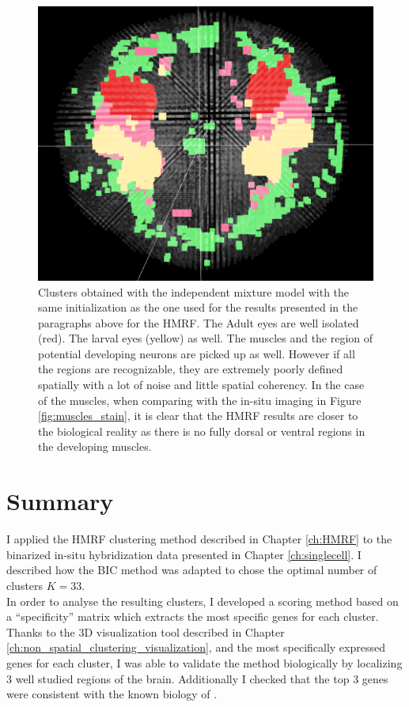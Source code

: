 	\begin{figure}[H]
\centerline{\includegraphics[width=\linewidth]{gfx/chapter6/mixture.png}}
\caption{Clusters obtained with the independent mixture model with the same initialization as the one used for the results presented in the paragraphs above for the HMRF. The Adult eyes are well isolated (red). The larval eyes (yellow) as well. The muscles and the region of potential developing neurons are picked up as well. However if all the regions are recognizable, they are extremely poorly defined spatially with a lot of noise and little spatial coherency. In the case of the muscles, when comparing with the in-situ imaging in Figure \ref{fig:muscles_stain}, it is clear that the HMRF results are closer to the biological reality as there is no fully dorsal or ventral regions in the developing muscles.}
\label{fig:mixture_clust}
	\end{figure}
	
	
	 

\section{Summary}
	
I applied the HMRF clustering method described in Chapter \ref{ch:HMRF} to the binarized in-situ hybridization data presented in Chapter \ref{ch:singlecell}. I described how the BIC method was adapted to chose the optimal number of clusters $K = 33$.\\

In order to analyse the resulting clusters, I developed a scoring method based on a ``specificity'' matrix which extracts the most specific genes for each cluster. Thanks to the 3D visualization tool described in Chapter \ref{ch:non_spatial_clustering_visualization}, and the most specifically expressed genes for each cluster, I was able to validate the method biologically by localizing 3 well studied regions of the brain. Additionally I checked that the top 3 genes were consistent with the known biology of \platy{}.\\

